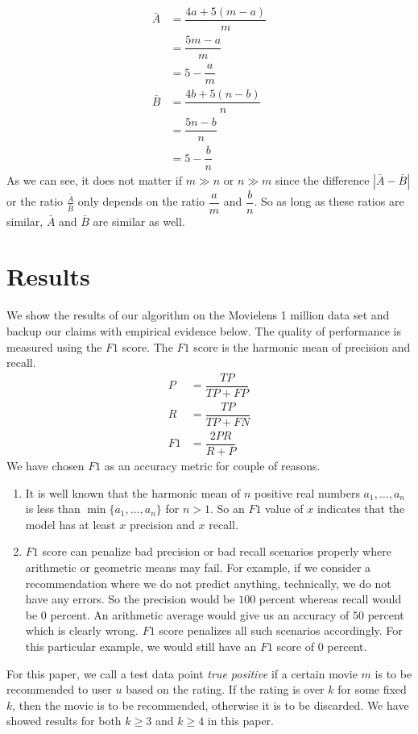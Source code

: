 \documentclass[manuscript,screen,review]{acmart}
\begin{document}
\begin{enumerate}
		\begin{align*}
			\bar{A}
			& = \dfrac{4a+5(m-a)}{m}\\
			& = \dfrac{5m-a}{m}\\
			& = 5-\dfrac{a}{m}\\
			\bar{B}
			& = \dfrac{4b+5(n-b)}{n}\\
			& = \dfrac{5n-b}{n}\\
			& = 5-\dfrac{b}{n}
		\end{align*}
		As we can see, it does not matter if $m\gg n$ or $n\gg m$ since the difference $|\bar{A}-\bar{B}|$ or the ratio $\frac{\bar{A}}{\bar{B}}$ only depends on the ratio $\dfrac{a}{m}$ and $\dfrac{b}{n}$. So as long as these ratios are similar, $\bar{A}$ and $\bar{B}$ are similar as well.
	\end{enumerate}\clearpage
	\section{Results}
	We show the results of our algorithm on the Movielens 1 million data set and backup our claims with empirical evidence below. The quality of performance is measured using the $F1$ score. The $F1$ score is the harmonic mean of precision and recall.
	\begin{align*}
		P
		& = \dfrac{TP}{TP+FP}\\
		R
		& = \dfrac{TP}{TP+FN}\\
		F1
		& = \dfrac{2PR}{R+P}
	\end{align*}
	We have chosen $F1$ as an accuracy metric for couple of reasons.
	\begin{enumerate}
		\item It is well known that the harmonic mean of $n$ positive real numbers $a_{1},\ldots,a_{n}$ is less than $\min\{a_{1},\ldots,a_{n}\}$ for $n>1$. So an $F1$ value of $x$ indicates that the model has at least $x$ precision and $x$ recall.
		\item $F1$ score can penalize bad precision or bad recall scenarios properly where arithmetic or geometric means may fail. For example, if we consider a recommendation where we do not predict anything, technically, we do not have any errors. So the precision would be $100$ percent whereas recall would be $0$ percent. An arithmetic average would give us an accuracy of $50$ percent which is clearly wrong. $F1$ score penalizes all such scenarios accordingly. For this particular example, we would still have an $F1$ score of $0$ percent.
	\end{enumerate}
	For this paper, we call a test data point \textit{true positive} if a certain movie $m$ is to be recommended to user $u$ based on the rating. If the rating is over $k$ for some fixed $k$, then the movie is to be recommended, otherwise it is to be discarded. We have showed results for both $k\geq 3$ and $k\geq 4$ in this paper.
\end{document}
